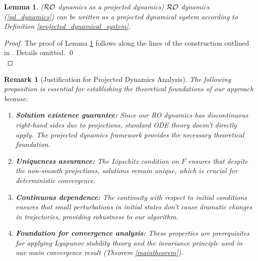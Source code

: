 \documentclass[journal,twoside,web]{ieeecolor}
\newtheorem{lemma}{Lemma}
\newtheorem{remark}{Remark}
\begin{document}
\begin{lemma} \label{projected} (${\cal RO}$ dynamics as a projected dynamics)
${\cal RO}$ dynamics (\ref{pd_dynamics}) can be written as a projected dynamical system according to Definition \ref{projected_dynamical_system}.
\end{lemma}
\begin{proof}
The proof of Lemma \ref{projected} follows along the lines of the construction outlined in \cite{cherukuri2016}. Details omitted. \qed\\
\end{proof}


{\color{blue} \begin{remark}[Justification for Projected Dynamics Analysis]
The following proposition is essential for establishing the theoretical foundations of our approach because:

\begin{enumerate}
\item \textbf{Solution existence guarantee:} Since our RO dynamics has discontinuous right-hand sides due to projections, standard ODE theory doesn't directly apply. The projected dynamics framework provides the necessary theoretical foundation.

\item \textbf{Uniqueness assurance:} The Lipschitz condition on $F$ ensures that despite the non-smooth projections, solutions remain unique, which is crucial for deterministic convergence.

\item \textbf{Continuous dependence:} The continuity with respect to initial conditions ensures that small perturbations in initial states don't cause dramatic changes in trajectories, providing robustness to our algorithm.

\item \textbf{Foundation for convergence analysis:} These properties are prerequisites for applying Lyapunov stability theory and the invariance principle used in our main convergence result (Theorem \ref{maintheorem}).
\end{enumerate}
\end{remark}}
\end{document}
